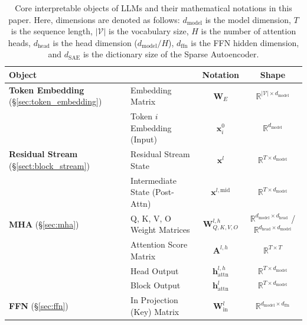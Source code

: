 \begin{table}[!t]
    \centering
    \caption{Core interpretable objects of LLMs and their mathematical notations in this paper. Here, dimensions are denoted as follows: $d_{\text{model}}$ is the model dimension, $T$ is the sequence length, $|\mathcal{V}|$ is the vocabulary size, $H$ is the number of attention heads, $d_\text{head}$ is the head dimension ($d_\text{model}/H$), $d_\text{ffn}$ is the FFN hidden dimension, and $d_\text{SAE}$ is the dictionary size of the Sparse Autoencoder.}
    \label{tab:interpretable_objects}
    \setlength\tabcolsep{5pt} %
    \fontsize{9}{13}\selectfont %
    \begin{tabular}{l l c c}
    \toprule[1.3pt]
    \textbf{Object} & & \textbf{Notation} & \textbf{Shape} \\
    \midrule
    \textbf{Token Embedding} (\S\ref{sec:token_embedding}) & Embedding Matrix & $\mathbf{W}_E$ & $\mathbb{R}^{|\mathcal{V}| \times d_{\text{model}}}$ \\
    & Token $i$ Embedding (Input) & $\mathbf{x}^0_{i}$ & $\mathbb{R}^{d_{\text{model}}}$ \\
    \addlinespace[2pt] \hdashline[1pt/1pt] \addlinespace[2pt]
    \textbf{Residual Stream} (\S\ref{sect:block_stream}) & Residual Stream State & $\mathbf{x}^l$ & $\mathbb{R}^{T \times d_{\text{model}}}$ \\
    & Intermediate State (Post-Attn) & $\mathbf{x}^{l, \text{mid}}$ & $\mathbb{R}^{T \times d_{\text{model}}}$ \\
    \addlinespace[2pt] \hdashline[1pt/1pt] \addlinespace[2pt]
    \textbf{MHA} (\S\ref{sec:mha}) & Q, K, V, O Weight Matrices & $\mathbf{W}_{Q,K,V,O}^{l,h}$ & $\mathbb{R}^{d_{\text{model}} \times d_\text{head}}$ / $\mathbb{R}^{d_\text{head} \times d_{\text{model}}}$ \\
    & Attention Score Matrix & $\mathbf{A}^{l,h}$ & $\mathbb{R}^{T \times T}$ \\
    & Head Output & $\mathbf{h}_{\text{attn}}^{l,h}$ & $\mathbb{R}^{T \times d_\text{model}}$ \\
    & Block Output & $\mathbf{h}_{\text{attn}}^{l}$ & $\mathbb{R}^{T \times d_{\text{model}}}$ \\
    \addlinespace[2pt] \hdashline[1pt/1pt] \addlinespace[2pt]
    \textbf{FFN} (\S\ref{sec:ffn}) & In Projection (Key) Matrix & $\mathbf{W}_{\text{in}}^l$ & $\mathbb{R}^{d_{\text{model}} \times d_\text{ffn}}$\\

\end{tabular}
\end{table}

